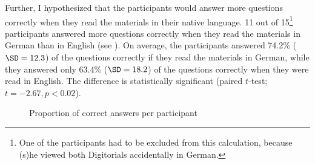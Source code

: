 \documentclass[output=paper]{langscibook}
\begin{document}
Further, I hypothesized that the participants would answer more questions correctly when they read the materials in their native language. 11 out of 15\footnote{One of the participants had to be excluded from this calculation, because (s)he viewed both Digitorials accidentally in German.} participants answered more questions correctly when they read the materials in German than in English (see ). On average, the participants answered 74.2\% ($\SD= 12.3$) of the questions correctly if they read the materials in German, while they answered only 63.4\% ($\SD= 18.2$) of the questions correctly when they were read in English. The difference is statistically significant (paired $t$-test; $t= -2.67, p< 0.02$).

\begin{figure}
    \caption{Proportion of correct answers per participant\label{fig1a}}    
\end{figure}
\end{document}
